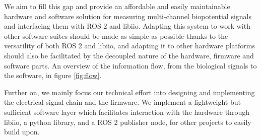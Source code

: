 \documentclass{thesis}
\begin{document}
We aim to fill this gap and provide an affordable and easily maintainable hardware and software solution for measuring multi-channel biopotential signals and interfacing them with ROS 2 and libiio. Adapting this system to work with other software suites should be made as simple as possible thanks to the versatility of both ROS 2 and libiio, and adapting it to other hardware platforms should also be facilitated by the decoupled nature of the hardware, firmware and software parts. An overview of the information flow, from the biological signals to the software, in figure \ref{fig:flow}.

Further on, we mainly focus our technical effort into designing and implementing the electrical signal chain and the firmware. We implement a lightweight but sufficient software layer which facilitates interaction with the hardware through libiio, a python library, and a ROS 2 publisher node, for other projects to easily build upon.
\end{document}
